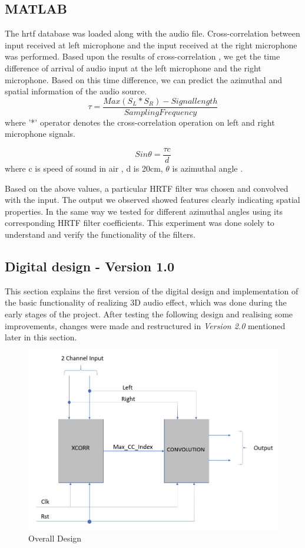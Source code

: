 \documentclass[BTech]{nitkdiss}
\begin{document}
\subsection{MATLAB}
The hrtf database was loaded along with the audio file. Cross-correlation between input received at left microphone and the input received at the right microphone was performed. Based upon the results of cross-correlation , we get the time difference of arrival of audio input at the left microphone and the right microphone. Based on this time difference, we can predict the azimuthal and spatial information of the audio source. 
\begin{equation}
\tau = \frac{Max(S_{L} * S_{R}) - Signal length}{Sampling Frequency} 
\end{equation}
where '*' operator denotes the cross-correlation operation on left and right microphone signals. 

\begin{equation}
Sin\theta = \frac{\tau c}{d}
\end{equation}
where c is speed of sound in air , d is 20cm, $\theta$ is azimuthal angle .

Based on the above values, a particular HRTF filter was chosen and convolved with the input. The output we observed showed features clearly indicating spatial properties. In the same way we tested for different azimuthal angles using its corresponding HRTF filter coefficients. This experiment was done solely to understand and verify the functionality of the filters. 
\subsection{Digital design - Version 1.0}

This section explains the first version of the digital design and implementation of the basic functionality of realizing 3D audio effect, which was done during the early stages of the project. After testing the following design and realising some improvements, changes were made and restructured in \textit{Version 2.0} mentioned later in this section.

\begin{figure}[h!]
\includegraphics[width = \textwidth, height = 8cm]{Architecture_main}
\caption{Overall Design}
\end{figure}
\end{document}

